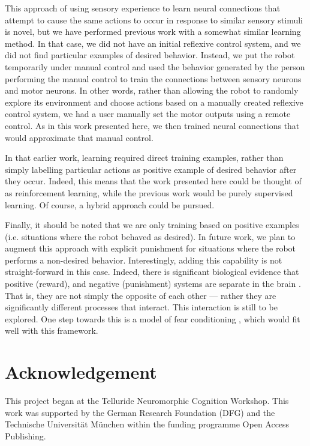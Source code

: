 \documentclass[conference]{IEEEtran}
\begin{document}
This approach of using sensory experience to learn neural connections
that attempt to cause the same actions to occur in response to similar
sensory stimuli is novel, but we have performed previous work \cite{conradt2014trainable}
with a somewhat similar learning method. In that case, we did not have an 
initial reflexive control system, and we did not find particular examples of 
desired behavior. Instead, we put the robot temporarily under manual control 
and used the behavior generated by the person performing the manual control 
to train the connections between sensory neurons and motor neurons.  In other
words, rather than allowing the robot to randomly explore its environment and
choose actions based on a manually created reflexive control system, we had
a user manually set the motor outputs using a remote control.  As in this work
presented here, we then trained neural connections that would approximate that
manual control.  

In that earlier work, learning required direct training examples, rather than 
simply labelling particular actions as positive example of desired behavior 
after they occur.  Indeed, this means that the work presented here could be 
thought of as reinforcement learning, while the previous work would be purely 
supervised learning. Of course, a hybrid approach could be pursued. 

Finally, it should be noted that we are only training based on positive 
examples (i.e. situations where the robot behaved as desired). In future work,
we plan to augment this approach with explicit punishment for situations where 
the robot performs a non-desired behavior. Interestingly, adding this capability
is not straight-forward in this case.  Indeed, there is significant biological 
evidence that positive (reward), and negative (punishment) systems are separate 
in the brain \cite{boureau2010}. That is, they are not simply the opposite of 
each other --- rather they are significantly different processes that interact. 
This interaction is still to be explored. One step towards this is a model
of fear conditioning \cite{kolbeck2013fear}, which would fit well with this framework.


\section*{Acknowledgement}

This project began at the Telluride Neuromorphic Cognition Workshop. 
This work was supported by the German Research Foundation (DFG) and the 
Technische Universit{\"a}t M{\"u}nchen within the funding programme Open Access Publishing.




\end{document}
